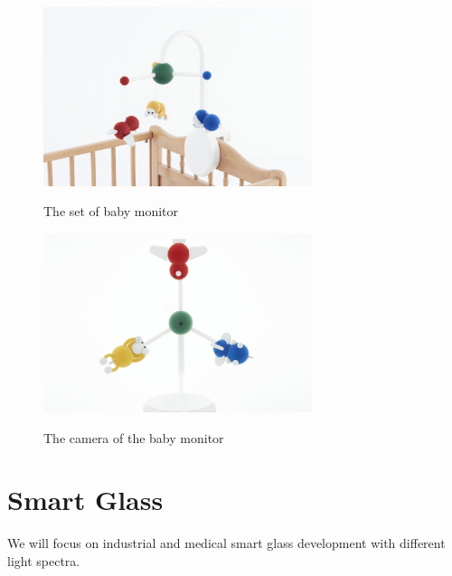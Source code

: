 \documentclass[a4paper,10pt]{report}
\begin{document}
\begin{figure}[ht]
  \centering
	\includegraphics[width=0.7\textwidth, keepaspectratio=true]{paby-stand}
  \caption{The set of baby monitor }\cite{paby-monitor}
  \label{fig:paby-stand}
\end{figure}

\begin{figure}[ht]
  \centering
	\includegraphics[width=0.7\textwidth, keepaspectratio=true]{paby-camera}
  \caption{The camera of the baby monitor}\cite{paby-monitor}
  \label{fig:paby-camera}
\end{figure}


\clearpage
\chapter{Smart Glass}
We will focus on industrial and medical smart glass development with different light spectra.
\end{document}
